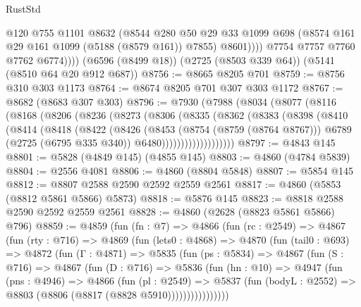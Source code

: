 \begin{lexlean}{RustStd}
\begin{coremodule}
                  @120
                  @755
                  @1101
                  @8632
                  (@8544
                    @280
                    @50
                    @29
                    @33
                    @1099
                    @698
                    (@8574 @161 @29 @161 @1099 (@5188 (@8579 @161)) @7855)
                    @8601))))
            @7754
            @7757
            @7760
            @7762
            @6774))))
    (@6596 (@8499 @18))
    (@2725 (@8503 @339 @64))
    (@5141 (@8510 @64 @20 @912 @687))
@8756 := @8665 @8205 @701
@8759 := @8756 @310 @303 @1173
@8764 := @8674 @8205 @701 @307 @303 @1172
@8767 := @8682 (@8683 @307 @303)
@8796 := @7930
    (@7988
      (@8034
        (@8077
          (@8116
            (@8168
              (@8206
                (@8236
                  (@8273
                    (@8306
                      (@8335
                        (@8362
                          (@8383
                            (@8398
                              (@8410
                                (@8414
                                  (@8418
                                    (@8422
                                      (@8426
                                        (@8453
                                          (@8754 (@8759 (@8764 @8767)))
                                          @6789
                                          (@2725 (@6795 @335 @340))
                                          @6480)))))))))))))))))))
@8797 := @4843 @145
@8801 := @5828 (@4849 @145) (@4855 @145)
@8803 := @4860 (@4784 @5839)
@8804 := @2556 @4081
@8806 := @4860 (@8804 @5848)
@8807 := @5854 @145
@8812 := @8807 @2588 @2590 @2592 @2559 @2561
@8817 := @4860 (@5853 (@8812 @5861 @5866) @5873)
@8818 := @5876 @145
@8823 := @8818 @2588 @2590 @2592 @2559 @2561
@8828 := @4860 (@2628 (@8823 @5861 @5866) @796)
@8859 := @4859
    (fun (fn : @7) =>
    @4866
      (fun (rc : @2549) =>
      @4867
        (fun (rty : @716) =>
        @4869
          (fun (lets0 : @4868) =>
          @4870
            (fun (tail0 : @693) =>
            @4872
              (fun (Γ : @4871) =>
              @5835
                (fun (ps : @5834) =>
                @4867
                  (fun (S : @716) =>
                  @4867
                    (fun (D : @716) =>
                    @5836
                      (fun (hn : @10) =>
                      @4947
                        (fun (pns : @4946) =>
                        @4866
                          (fun (pl : @2549) =>
                          @5837
                            (fun (bodyL : @2552) => @8803 (@8806 (@8817 (@8828 @5910))))))))))))))))

\end{coremodule}
\end{lexlean}
